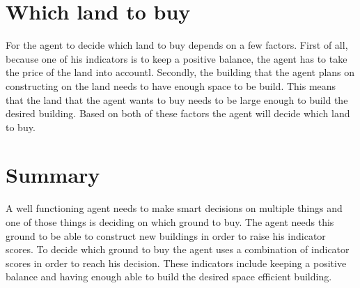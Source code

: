 \documentclass{article}
\begin{document}
\section{Which land to buy}
For the agent to decide which land to buy depends on a few factors. First of all, because one of his indicators is to keep a positive balance, the agent has to take the price of the land into accountl. Secondly, the building that the agent plans on constructing on the land needs to have enough space to be build. This means that the land that the agent wants to buy needs to be large enough to build the desired building. Based on both of these factors the agent will decide which land to buy. 

\section{Summary}
A well functioning agent needs to make smart decisions on multiple things and one of those things is deciding on which ground to buy. The agent needs this ground to be able to construct new buildings in order to raise his indicator scores. To decide which ground to buy the agent uses a combination of indicator scores in order to reach his decision. These indicators include keeping a positive balance and having enough able to build the desired space efficient building.
\end{document}
